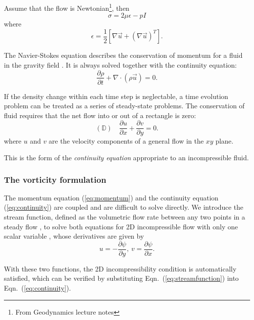 \documentclass[12pt]{article}
\numberwithin{figure}{section}  %
\numberwithin{equation}{section}  %
\begin{document}
\begin{multicols}{2}
Assume that the flow is Newtonian\footnote{From Geodynamics lecture notes}, then
\begin{equation}
    \sigma = 2\mu\epsilon - pI
\end{equation}
where
\begin{equation}
    \epsilon = \frac{1}{2}[\nabla\vec{u} + (\nabla\vec{u})^T].
\end{equation}

The Navier-Stokes equation describes the conservation of momentum for a fluid in the gravity field \citep{gerya2009introduction}. It is always solved together with the continuity equation:
\begin{equation}
    \dfrac{\partial\rho}{\partial{t}} + \nabla\cdot(\rho\vec{u}) = 0.
\end{equation}

If the density change within each time step is neglectable, a time evolution problem can be treated as a series of steady-state problems. The conservation of fluid requires that the net flow into or out of a rectangle is zero:
\begin{equation}\label{eq:continuity}
    (\mathbb{D})\quad\dfrac{\partial{u}}{\partial{x}} + \dfrac{\partial{v}}{\partial{y}} = 0.
\end{equation}
where $u$ and $v$ are the velocity components of a general flow in the $xy$ plane.

This is the form of the \emph{continuity equation} appropriate to an incompressible fluid.

\subsubsection{The vorticity formulation}

The momentum equation (\ref{eq:momentum}) and the continuity equation (\ref{eq:continuity}) are coupled and are difficult to solve directly. We introduce the stream function, defined as the volumetric flow rate between any two points in a steady flow \citep{turcotte2014geodynamics}, to solve both equations for 2D incompressible flow with only one scalar variable \citep{ben2005pure}, whose derivatives are given by
\begin{equation}\label{eq:streamfunction}
    u = -\dfrac{\partial\psi}{\partial{y}},\ v = \dfrac{\partial\psi}{\partial{x}}.
\end{equation}

With these two functions, the 2D incompressibility condition is automatically satisfied, which can be verified by substituting Eqn.\ (\ref{eq:streamfunction}) into Eqn.\ (\ref{eq:continuity}).


\end{multicols}
\end{document}
